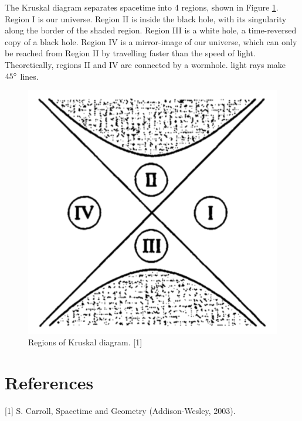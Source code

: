 \documentclass[10pt]{article}
\begin{document}
The Kruskal diagram separates spacetime into 4 regions, shown in Figure \ref{fig:kruskalregions}. Region I is our universe. Region II is inside the black hole, with its singularity along the border of the shaded region. Region III is a white hole, a time-reversed copy of a black hole. Region IV is a mirror-image of our universe, which can only be reached from Region II by travelling faster than the speed of light. Theoretically, regions II and IV are connected by a wormhole.
light rays make $45\degree$ lines.
\begin{figure}[h]\label{fig:kruskalregions}
\centering
\includegraphics[scale=0.25]{carroll_fig_5_13.png}
\caption{Regions of Kruskal diagram. [1]} 
\end{figure}

\newpage
\section{References}
[1] S. Carroll, Spacetime and Geometry (Addison-Wesley,
2003).
\end{document}
